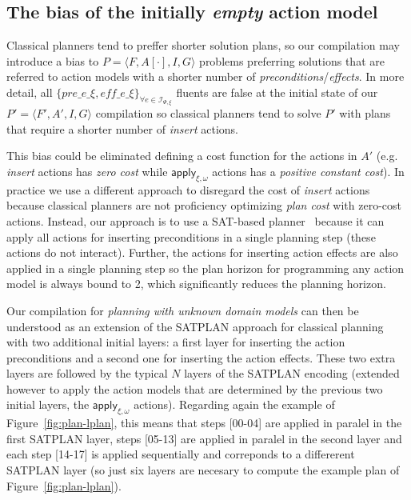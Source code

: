 \documentclass{article}
\newcommand{\tup}[1]{{\langle #1 \rangle}}
\begin{document}
\subsection{The bias of the initially {\em empty} action model}
Classical planners tend to preffer shorter solution plans, so our compilation may introduce a bias to $P=\tup{F,A[\cdot],I,G}$ problems preferring solutions that are referred to action models with a shorter number of {\em preconditions}/{\em effects}. In more detail, all $\{pre\_e\_\xi, eff\_e\_\xi\}_{\forall e\in{\mathcal I}_{\Psi,\xi}}$ fluents are false at the initial state of our $P'=\tup{F',A',I,G}$ compilation so classical planners tend to solve $P'$ with plans that require a shorter number of {\em insert} actions.

This bias could be eliminated defining a cost function for the actions in $A'$ (e.g. {\em insert} actions has {\em zero cost} while $\mathsf{apply_{\xi,\omega}}$ actions has a {\em positive constant cost}). In practice we use a different approach to disregard the cost of {\em insert} actions because classical planners are not proficiency optimizing {\em plan cost} with zero-cost actions. Instead, our approach is to use a SAT-based planner~\cite{rintanen2014madagascar} because it can apply all actions for inserting preconditions in a single planning step (these actions do not interact). Further, the actions for inserting action effects are also applied in a single planning step so the plan horizon for programming any action model is always bound to 2, which significantly reduces the planning horizon.

Our compilation for {\em planning with unknown domain models} can then be understood as an extension of the SATPLAN approach for classical planning~\cite{kautz1992planning} with two additional initial layers: a first layer for inserting the action preconditions and a second one for inserting the action effects. These two extra layers are followed by the typical $N$ layers of the SATPLAN encoding (extended however to apply the action models that are determined by the previous two initial layers, the $\mathsf{apply_{\xi,\omega}}$ actions). Regarding again the example of Figure~\ref{fig:plan-lplan}, this means that steps [00-04] are applied in paralel in the first SATPLAN layer, steps [05-13] are applied in paralel in the second layer and each step [14-17] is applied sequentially and correponds to a differerent SATPLAN layer (so just six layers are necesary to compute the example plan of Figure~\ref{fig:plan-lplan}).
\end{document}
